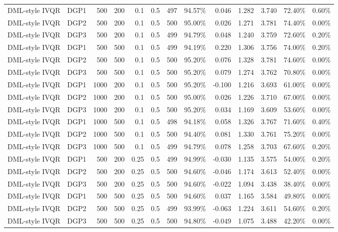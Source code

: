 \begin{landscape}
\begin{longtable}{llrrrrrrrrrrr}
DML-style IVQR & DGP1 & 500 & 200 & 0.1 & 0.5 & 497 & 94.57\% & 0.046 & 1.282 & 3.740 & 72.40\% & 0.60\% \\
DML-style IVQR & DGP2 & 500 & 200 & 0.1 & 0.5 & 500 & 95.00\% & 0.026 & 1.271 & 3.781 & 74.40\% & 0.00\% \\
DML-style IVQR & DGP3 & 500 & 200 & 0.1 & 0.5 & 499 & 94.79\% & 0.048 & 1.240 & 3.759 & 72.60\% & 0.20\% \\
DML-style IVQR & DGP1 & 500 & 500 & 0.1 & 0.5 & 499 & 94.19\% & 0.220 & 1.306 & 3.756 & 74.00\% & 0.20\% \\
DML-style IVQR & DGP2 & 500 & 500 & 0.1 & 0.5 & 500 & 95.20\% & 0.076 & 1.328 & 3.781 & 74.60\% & 0.00\% \\
DML-style IVQR & DGP3 & 500 & 500 & 0.1 & 0.5 & 500 & 95.20\% & 0.079 & 1.274 & 3.762 & 70.80\% & 0.00\% \\
DML-style IVQR & DGP1 & 1000 & 200 & 0.1 & 0.5 & 500 & 95.20\% & -0.100 & 1.216 & 3.693 & 61.00\% & 0.00\% \\
DML-style IVQR & DGP2 & 1000 & 200 & 0.1 & 0.5 & 500 & 95.00\% & 0.026 & 1.226 & 3.710 & 67.00\% & 0.00\% \\
DML-style IVQR & DGP3 & 1000 & 200 & 0.1 & 0.5 & 500 & 95.20\% & 0.034 & 1.169 & 3.609 & 53.60\% & 0.00\% \\
DML-style IVQR & DGP1 & 1000 & 500 & 0.1 & 0.5 & 498 & 94.18\% & 0.058 & 1.326 & 3.767 & 71.60\% & 0.40\% \\
DML-style IVQR & DGP2 & 1000 & 500 & 0.1 & 0.5 & 500 & 94.40\% & 0.081 & 1.330 & 3.761 & 75.20\% & 0.00\% \\
DML-style IVQR & DGP3 & 1000 & 500 & 0.1 & 0.5 & 499 & 94.79\% & 0.078 & 1.258 & 3.703 & 67.60\% & 0.20\% \\
DML-style IVQR & DGP1 & 500 & 200 & 0.25 & 0.5 & 499 & 94.99\% & -0.030 & 1.135 & 3.575 & 54.00\% & 0.20\% \\
DML-style IVQR & DGP2 & 500 & 200 & 0.25 & 0.5 & 500 & 94.60\% & -0.046 & 1.174 & 3.613 & 52.40\% & 0.00\% \\
DML-style IVQR & DGP3 & 500 & 200 & 0.25 & 0.5 & 500 & 94.60\% & -0.022 & 1.094 & 3.438 & 38.40\% & 0.00\% \\
DML-style IVQR & DGP1 & 500 & 500 & 0.25 & 0.5 & 500 & 94.60\% & 0.037 & 1.165 & 3.584 & 49.80\% & 0.00\% \\
DML-style IVQR & DGP2 & 500 & 500 & 0.25 & 0.5 & 499 & 93.99\% & -0.063 & 1.224 & 3.611 & 54.60\% & 0.20\% \\
DML-style IVQR & DGP3 & 500 & 500 & 0.25 & 0.5 & 500 & 94.80\% & -0.049 & 1.075 & 3.488 & 42.20\% & 0.00\% \\

\end{longtable}
\end{landscape}
